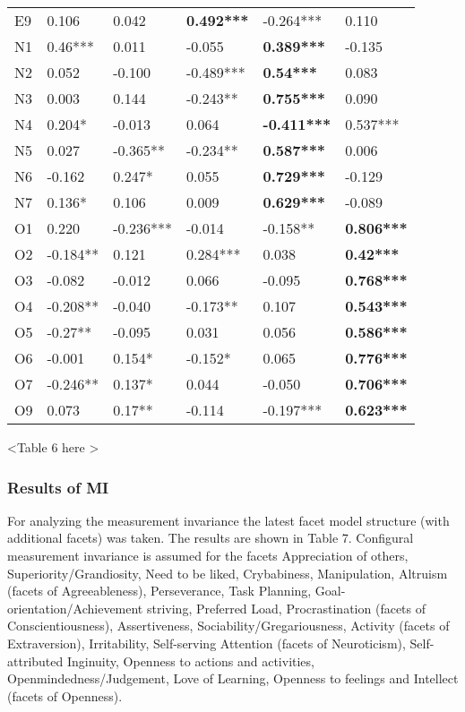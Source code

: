 \documentclass[man]{apa6}
\theoremstyle{definition}
\theoremstyle{definition}
\theoremstyle{definition}
\theoremstyle{remark}
\begin{document}
\begin{table}[ht]
\begin{tabular}{llllll}
  E9 & 0.106 & 0.042 & \textbf{0.492***} & -0.264*** & 0.110 \\ 
  N1 & 0.46*** & 0.011 & -0.055 & \textbf{0.389***} & -0.135 \\ 
  N2 & 0.052 & -0.100 & -0.489*** & \textbf{0.54***} & 0.083 \\ 
  N3 & 0.003 & 0.144 & -0.243** & \textbf{0.755***} & 0.090 \\ 
  N4 & 0.204* & -0.013 & 0.064 & \textbf{-0.411***} & 0.537*** \\ 
  N5 & 0.027 & -0.365** & -0.234** & \textbf{0.587***} & 0.006 \\ 
  N6 & -0.162 & 0.247* & 0.055 & \textbf{0.729***} & -0.129 \\ 
  N7 & 0.136* & 0.106 & 0.009 & \textbf{0.629***} & -0.089 \\ 
  O1 & 0.220 & -0.236*** & -0.014 & -0.158** & \textbf{0.806***} \\ 
  O2 & -0.184** & 0.121 & 0.284*** & 0.038 & \textbf{0.42***} \\ 
  O3 & -0.082 & -0.012 & 0.066 & -0.095 & \textbf{0.768***} \\ 
  O4 & -0.208** & -0.040 & -0.173** & 0.107 & \textbf{0.543***} \\ 
  O5 & -0.27** & -0.095 & 0.031 & 0.056 & \textbf{0.586***} \\ 
  O6 & -0.001 & 0.154* & -0.152* & 0.065 & \textbf{0.776***} \\ 
  O7 & -0.246** & 0.137* & 0.044 & -0.050 & \textbf{0.706***} \\ 
  O9 & 0.073 & 0.17** & -0.114 & -0.197*** & \textbf{0.623***} \\ 
   \hline
\end{tabular}
\endgroup
\end{table}
\vspace{5mm}

\textless{}Table 6 here \textgreater{}

\vspace{5mm}

\hypertarget{results-of-mi}{%
\subsubsection{Results of MI}\label{results-of-mi}}

For analyzing the measurement invariance the latest facet model
structure (with additional facets) was taken. The results are shown in
Table 7. Configural measurement invariance is assumed for the facets
Appreciation of others, Superiority/Grandiosity, Need to be liked,
Crybabiness, Manipulation, Altruism (facets of Agreeableness),
Perseverance, Task Planning, Goal-orientation/Achievement striving,
Preferred Load, Procrastination (facets of Conscientiousness),
Assertiveness, Sociability/Gregariousness, Activity (facets of
Extraversion), Irritability, Self-serving Attention (facets of
Neuroticism), Self-attributed Inginuity, Openness to actions and
activities, Openmindedness/Judgement, Love of Learning, Openness to
feelings and Intellect (facets of Openness).
\end{document}
